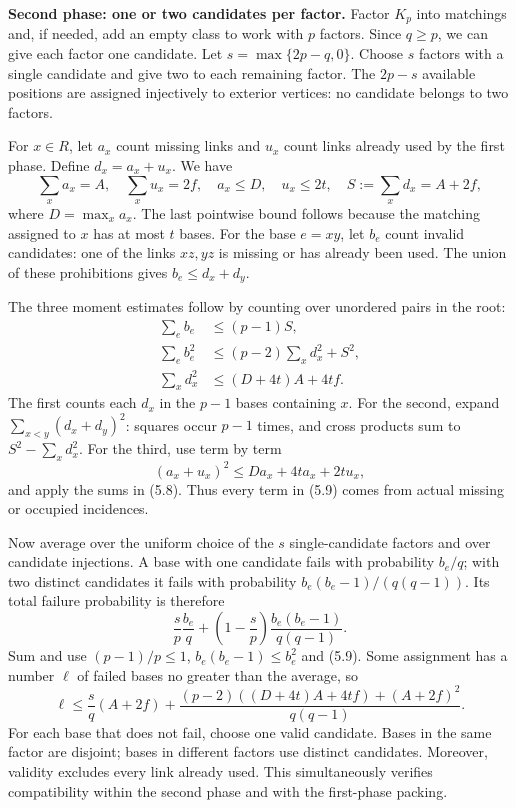 \documentclass[english,11pt,a4paper]{article}
\begin{document}
\textbf{Second phase: one or two candidates per factor.} Factor \(K_p\) into matchings and, if needed, add an empty class to work with \(p\) factors. Since \(q\ge p\), we can give each factor one candidate. Let \(s=\max\{2p-q,0\}\). Choose \(s\) factors with a single candidate and give two to each remaining factor. The \(2p-s\) available positions are assigned injectively to exterior vertices: no candidate belongs to two factors.

For \(x\in R\), let \(a_x\) count missing links and \(u_x\) count links already used by the first phase. Define \(d_x=a_x+u_x\). We have \[
\sum_xa_x=A,\quad \sum_xu_x=2f,\quad
a_x\le D,\quad u_x\le2t,\quad
S:=\sum_xd_x=A+2f,
\tag{5.8}
\] where \(D=\max_xa_x\). The last pointwise bound follows because the matching assigned to \(x\) has at most \(t\) bases. For the base \(e=xy\), let \(b_e\) count invalid candidates: one of the links \(xz,yz\) is missing or has already been used. The union of these prohibitions gives \(b_e\le d_x+d_y\).

The three moment estimates follow by counting over unordered pairs in the root: \[
\begin{aligned}
\sum_e b_e&\le(p-1)S,\\
\sum_e b_e^2&\le(p-2)\sum_xd_x^2+S^2,\\
\sum_xd_x^2&\le(D+4t)A+4tf.
\end{aligned}
\tag{5.9}
\] The first counts each \(d_x\) in the \(p-1\) bases containing \(x\). For the second, expand \(\sum_{x<y}(d_x+d_y)^2\): squares occur \(p-1\) times, and cross products sum to \(S^2-\sum_xd_x^2\). For the third, use term by term \[
(a_x+u_x)^2\le Da_x+4ta_x+2tu_x,
\] and apply the sums in (5.8). Thus every term in (5.9) comes from actual missing or occupied incidences.

Now average over the uniform choice of the \(s\) single-candidate factors and over candidate injections. A base with one candidate fails with probability \(b_e/q\); with two distinct candidates it fails with probability \(b_e(b_e-1)/(q(q-1))\). Its total failure probability is therefore \[
\frac{s}{p}\frac{b_e}{q}
+\left(1-\frac{s}{p}\right)\frac{b_e(b_e-1)}{q(q-1)}.
\tag{5.10}
\] Sum and use \((p-1)/p\le1\), \(b_e(b_e-1)\le b_e^2\) and (5.9). Some assignment has a number \(\ell\) of failed bases no greater than the average, so \[
\ell\le\frac{s}{q}(A+2f)
+\frac{(p-2)((D+4t)A+4tf)+(A+2f)^2}{q(q-1)}.
\tag{5.11}
\] For each base that does not fail, choose one valid candidate. Bases in the same factor are disjoint; bases in different factors use distinct candidates. Moreover, validity excludes every link already used. This simultaneously verifies compatibility within the second phase and with the first-phase packing.
\end{document}
